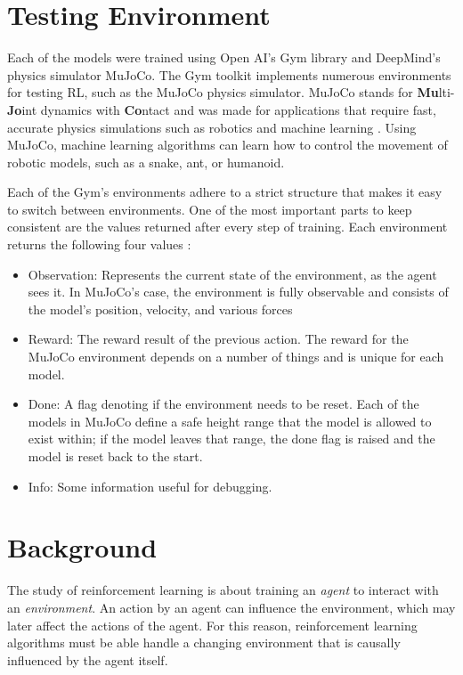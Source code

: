 \documentclass[conference]{IEEEtran}
\begin{document}
\section{Testing Environment}

Each of the models were trained using Open AI's Gym library and DeepMind's physics simulator MuJoCo. The Gym toolkit implements numerous environments for testing RL, such as the MuJoCo physics simulator. MuJoCo stands for {\bf Mu}lti-{\bf Jo}int dynamics with {\bf Co}ntact and was made for applications that require fast, accurate physics simulations such as robotics and machine learning \cite{mujoco_docs}. Using MuJoCo, machine learning algorithms can learn how to control the movement of robotic models, such as a snake, ant, or humanoid.

Each of the Gym's environments adhere to a strict structure that makes it easy to switch between environments. One of the most important parts to keep consistent are the values returned after every step of training. Each environment returns the following four values \cite{gym_docs}:

\begin{itemize}
    \item Observation: Represents the current state of the environment, as the agent sees it. In MuJoCo's case, the          environment is fully observable and consists of the model's position, velocity, and various forces \cite{gym_source}
    \item Reward: The reward result of the previous action. The reward for the MuJoCo environment depends on a          number of things and is unique for each model.
    \item Done: A flag denoting if the environment needs to be reset. Each of the models in MuJoCo define a safe height range that the model is allowed to exist within; if the model leaves that range, the done flag is raised and the model is reset back to the start.
    \item Info: Some information useful for debugging.
\end{itemize}

\section{Background}

The study of reinforcement learning is about training an \textit{agent} to interact with an \textit{environment}. An action by an agent can influence the environment, which may later affect the actions of the agent. For this reason, reinforcement learning algorithms must be able handle a changing environment that is causally influenced by the agent itself.
\end{document}
